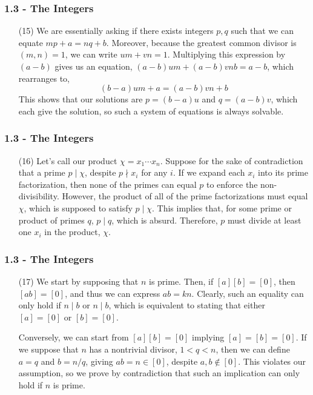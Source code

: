\documentclass{beamer}
\begin{document}
\begin{frame}
\frametitle{1.3 - The Integers}
\small
\begin{enumerate}
	\item[(15)] We are essentially asking if there exists integers $p, q$ such that we can equate $mp+a=nq+b$. Moreover, because the greatest common divisor is $(m,n)=1$, we can write $um+vn=1$. Multiplying this expression by $(a-b)$ gives us an equation, $(a-b)um+(a-b)vnb = a-b$, which rearranges to,
	\begin{equation*}
	(b-a)um + a = (a-b)vn + b
	\end{equation*}		
	This shows that our solutions are $p=(b-a)u$ and $q=(a-b)v$, which each give the solution, so such a system of equations is always solvable.
\end{enumerate}
\end{frame}
\begin{frame}
\frametitle{1.3 - The Integers}
\small
\begin{enumerate}
	\item[(16)] Let's call our product $\chi = x_1 \cdots x_n$.  Suppose for the sake of contradiction that a prime $p \mid\chi$, despite $p\nmid x_i$ for any $i$. If we expand each $x_i$ into its prime factorization, then none of the primes can equal $p$ to enforce the non-divisibility. However, the product of all of the prime factorizations must equal $\chi$, which is supposed to satisfy $p\mid\chi$. This implies that, for some prime or product of primes $q$, $p\mid q$, which is absurd. Therefore, $p$ must divide at least one $x_i$ in the product, $\chi$. 
\end{enumerate}
\end{frame}
\begin{frame}
\frametitle{1.3 - The Integers}
\small
\begin{enumerate}
	\item[(17)] \quad We start by supposing that $n$ is prime. Then, if $[a][b]=[0]$, then $[ab]=[0]$, and thus we can express $ab = kn$. Clearly, such an equality can only hold if $n\mid b$ or $n\mid b$, which is equivalent to stating that either $[a]=[0]$ or $[b]=[0]$.
	
	\quad Conversely, we can start from $[a][b]=[0]$ implying $[a]=[b]=[0]$. If we suppose that $n$ has a nontrivial divisor, $1<q<n$, then we can define $a=q$ and $b= n/q$, giving $ab = n \in [0]$, despite $a,b\notin[0]$. This violates our assumption, so we prove by contradiction that such an implication can only hold if $n$ is prime.
\end{enumerate}
\end{frame}
\end{document}
